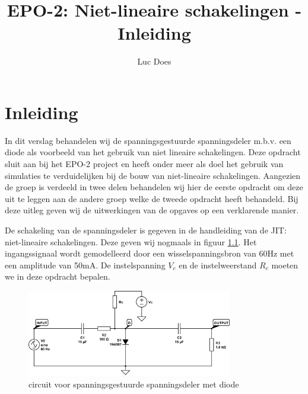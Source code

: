 \documentclass{report}
\title{EPO-2: Niet-lineaire schakelingen - Inleiding}
\author{Luc Does}
\begin{document}
\chapter{Inleiding}
\label{ch:inleiding}

In dit verslag behandelen wij de spanningsgestuurde spanningsdeler m.b.v. een diode als voorbeeld van het gebruik van niet lineaire schakelingen. Deze opdracht sluit aan bij het EPO-2 project en heeft onder meer als doel het gebruik van simulaties te verduidelijken bij de bouw van niet-lineaire schakelingen. \newline
Aangezien de groep is verdeeld in twee delen behandelen wij hier de eerste opdracht om deze uit te leggen aan de andere groep welke de tweede opdracht heeft behandeld. Bij deze uitleg geven wij de uitwerkingen van de opgaves op een verklarende manier.
\newline

\noindent De schakeling van de spanningsdeler is gegeven in de handleiding van de JIT: niet-lineaire schakelingen. Deze geven wij nogmaals in figuur \ref{fig:totaalschema}. Het ingangssignaal wordt gemodelleerd door een wisselspanningsbron van 60Hz met een amplitude van 50mA. De instelspanning $V_c$ en de instelweerstand $R_c$ moeten we in deze opdracht bepalen.

\begin{figure}[H]
	\centering
	\includegraphics[width=0.8\textwidth]{totaal-circuit-spanningsgestuurde-spanningsdeler.png}
	\caption{circuit voor spanningsgestuurde spanningsdeler met diode}
	\label{fig:totaalschema}
\end{figure}
\end{document}
